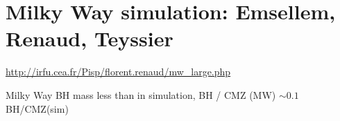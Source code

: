 \section{Milky Way simulation: Emsellem, Renaud, Teyssier}

\url{http://irfu.cea.fr/Pisp/florent.renaud/mw_large.php}

Milky Way BH mass less than in simulation, BH / CMZ (MW) $\sim0.1$ BH/CMZ(sim)